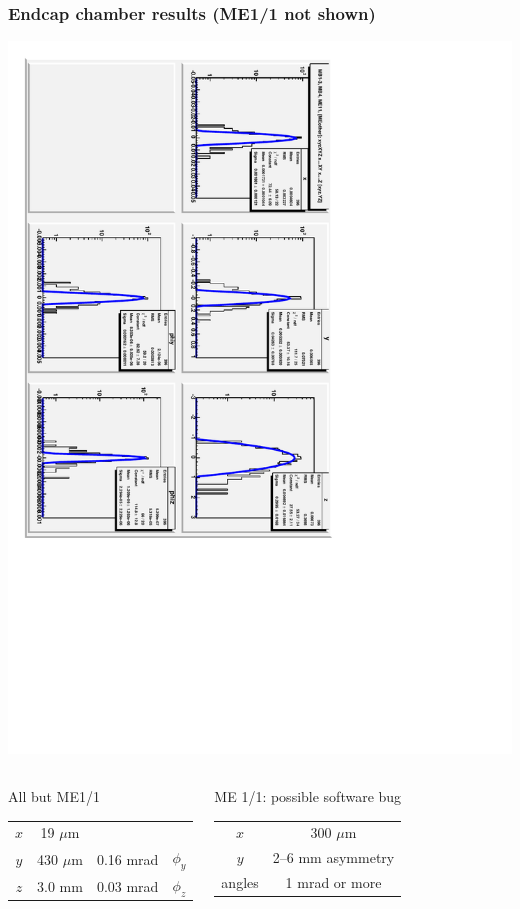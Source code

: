 \documentclass[compress]{beamer}
\begin{document}
\begin{frame}
\frametitle{Endcap chamber results \hfill {\small (ME1/1 not shown)}}
\vspace{-0.25 cm}
\begin{center}
\includegraphics[height=0.7\linewidth, angle=90]{optimal_endcap_alignment.pdf}
\end{center}

\vspace{-0.75 cm}
\begin{columns}
\begin{center}
All but ME1/1
\begin{tabular}{c c | c c}
\hline\hline
$x$ & 19 $\mu$m & \\
$y$ & 430 $\mu$m & 0.16 mrad & $\phi_y$ \\
$z$ & 3.0 mm & 0.03 mrad & $\phi_z$ \\
\hline\hline
\end{tabular}
\end{center}

\begin{center}
ME 1/1: possible software bug
\begin{tabular}{c c}
\hline\hline
$x$ & 300 $\mu$m \\
$y$ & 2--6 mm asymmetry \\
angles & 1 mrad or more \\
\hline\hline
\end{tabular}
\end{center}
\end{columns}
\end{frame}
\end{document}
